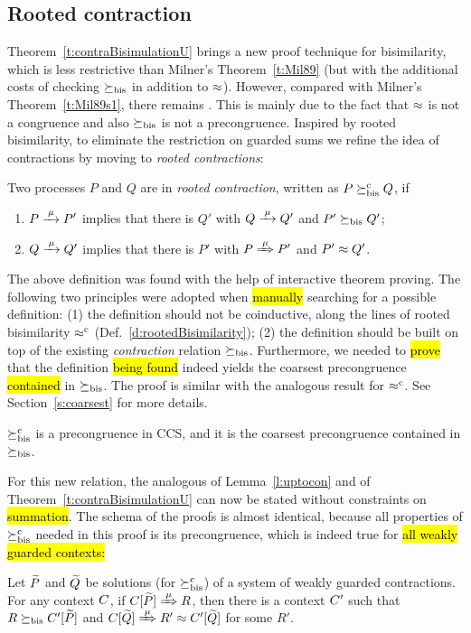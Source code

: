 \subsection{Rooted contraction}
\label{ss:new}

Theorem~\ref{t:contraBisimulationU} brings a new proof technique for
bisimilarity, which is  less restrictive than Milner's
Theorem~\ref{t:Mil89} (but with the additional costs of checking $\mathrel{\succeq_{\rm{bis}}}$
in addition to $\approx$).
However, compared with Milner's Theorem~\ref{t:Mil89s1}, there remains
. This is mainly due to the fact that $\approx$ is not a
 congruence and also $\mathrel{\succeq_{\rm{bis}}}$ is not a precongruence.
Inspired by rooted bisimilarity, to eliminate the restriction
on guarded sums we refine the idea of contractions by moving
to \emph{rooted contractions}:

\begin{definition}
\label{d:rcontra}
Two processes $P$ and $Q$ are in \emph{rooted contraction}, written as
 $P\mathrel{\succeq^{\rm{c}}_{\rm{bis}}} Q$, if
\begin{enumerate}
\item $P \arr\mu P'$ implies that there is $Q'$ with $Q \arr \mu Q'$
 and $P'\mathrel{\succeq_{\rm{bis}}} Q'$;
\item $Q \arr\mu Q'$   implies that there is $P'$ with $P \Arr \mu
 P'$ and $P' \approx Q'$\enspace.
\end{enumerate}
\end{definition}

The above definition was found with the help of interactive theorem proving.
The following two principles were adopted when \hl{manually} searching
for a possible definition: (1) the definition should not be coinductive,
along the lines of rooted bisimilarity $\mathrel{\approx^{\rm{c}}}$ (Def.~\ref{d:rootedBisimilarity});
(2) the definition should be built on top of  the existing \emph{contraction}
relation $\mathrel{\succeq_{\rm{bis}}}$.
Furthermore, we needed to \hl{prove} that the definition \hl{being found}
indeed yields the coarsest precongruence
\hl{contained} in $\mathrel{\succeq_{\rm{bis}}}$. The proof is similar with
the analogous result for $\mathrel{\approx^{\rm{c}}}$. See Section~\ref{s:coarsest} for
more details.

\begin{theorem}
\label{t:rcontrPrecongruence}
$\mathrel{\succeq^{\rm{c}}_{\rm{bis}}}$ is a precongruence in CCS, and it is the coarsest
precongruence contained in $\mathrel{\succeq_{\rm{bis}}}$.
\end{theorem}  

For this new relation, the analogous of Lemma~\ref{l:uptocon} and of
Theorem~\ref{t:contraBisimulationU} can now be stated without
constraints on \hl{summation}.
The schema of the proofs is almost identical, because all 
properties of $\mathrel{\succeq^{\rm{c}}_{\rm{bis}}}$ needed in this proof is its precongruence, which is
indeed true for \hl{all weakly guarded contexts:} %
\begin{lemma}
\label{l:ruptocon}
Let $\widetilde P$ and $\widetilde Q$ be solutions (for $\mathrel{\succeq^{\rm{c}}_{\rm{bis}}}$)
 of a system of weakly guarded contractions.
For any context $C$, 
if  $\ct{\til P}\Arr{\mu}  R$,
 then there is a context $C'$
such that $R \mathrel{\succeq_{\rm{bis}}} C' [\widetilde P]$ and  $\ct{\til Q} \Arr{\mu} R'
 \wb \ctp{\til Q}$ for some $R'$.
\end{lemma}

